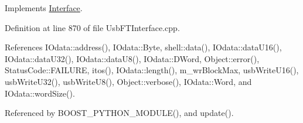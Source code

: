 Implements \hyperlink{classInterface_ad665cacbaf490a26c1c4ba192022e68a}{Interface}.



Definition at line 870 of file Usb\+F\+T\+Interface.\+cpp.



References I\+Odata\+::address(), I\+Odata\+::\+Byte, shell\+::data(), I\+Odata\+::data\+U16(), I\+Odata\+::data\+U32(), I\+Odata\+::data\+U8(), I\+Odata\+::\+D\+Word, Object\+::error(), Status\+Code\+::\+F\+A\+I\+L\+U\+RE, itos(), I\+Odata\+::length(), m\+\_\+wr\+Block\+Max, usb\+Write\+U16(), usb\+Write\+U32(), usb\+Write\+U8(), Object\+::verbose(), I\+Odata\+::\+Word, and I\+Odata\+::word\+Size().



Referenced by B\+O\+O\+S\+T\+\_\+\+P\+Y\+T\+H\+O\+N\+\_\+\+M\+O\+D\+U\+L\+E(), and update().


